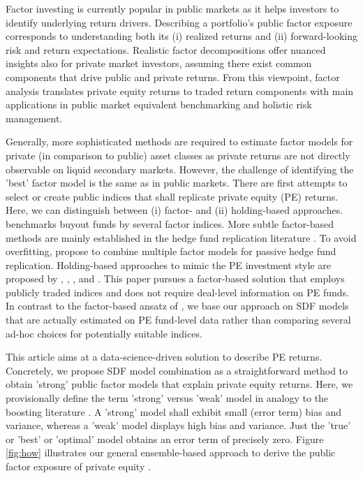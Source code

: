 \documentclass[12pt]{article}
\begin{document}
Factor investing is currently popular in public markets as it helps investors to identify underlying return drivers.
Describing a portfolio's public factor exposure corresponds to understanding both its (i) realized returns and (ii) forward-looking risk and return expectations.
Realistic factor decompositions offer nuanced insights also for private market investors, assuming there exist common components that drive public and private returns.
From this viewpoint, factor analysis translates private equity returns to traded return components with main applications in public market equivalent benchmarking and holistic risk management.

Generally, more sophisticated methods are required to estimate factor models for private (in comparison to public) asset classes as private returns are not directly observable on liquid secondary markets.
However, the challenge of identifying the 'best' factor model is the same as in public markets.
There are first attempts to select or create public indices that shall replicate private equity (PE) returns.
Here, we can distinguish between (i) factor- and (ii) holding-based approaches.
\cite{P14} benchmarks buyout funds by several factor indices.
More subtle factor-based methods are mainly established in the hedge fund replication literature \citep{TV08,W14}.
To avoid overfitting, \cite{OST17} propose to combine multiple factor models for passive hedge fund replication.
Holding-based approaches to mimic the PE investment style are proposed by \cite{LSSL16}, \cite{S17}, \cite{MS19}, and \cite{PP19}.
This paper pursues a factor-based solution that employs publicly traded indices and does not require deal-level information on PE funds.
In contrast to the factor-based ansatz of \cite{P14}, we base our approach on SDF models that are actually estimated on PE fund-level data rather than comparing several ad-hoc choices for potentially suitable indices.

This article aims at a data-science-driven solution to describe PE returns.
Concretely, we propose SDF model combination as a straightforward method to obtain 'strong' public factor models that explain private equity returns.
Here, we provisionally define the term 'strong' versus 'weak' model in analogy to the boosting literature \citep{S90}.
A 'strong' model shall exhibit small (error term) bias and variance, whereas a 'weak' model displays high bias and variance.
Just the 'true' or 'best' or 'optimal' model obtains an error term of precisely zero.
Figure \ref{fig:how} illustrates our general ensemble-based approach to derive the public factor exposure of private equity \citep{B12}.
\end{document}
